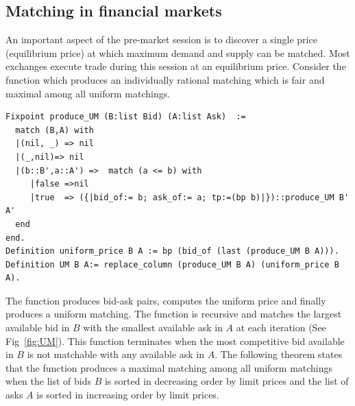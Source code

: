 \documentclass[a4paper,UKenglish,cleveref, autoref]{lipics-v2019}
\begin{document}
\begin{theorem}
\end{theorem}


\subsection{Matching in financial markets}\label{sec:matchingInMarkets} 

An important aspect of the pre-market session is to discover a single price (equilibrium price) at which maximum demand and supply can be matched. Most exchanges execute trade during this session at an equilibrium price.  Consider the function   which produces an individually rational matching which is fair and maximal among all uniform matchings.

\begin{verbatim}
Fixpoint produce_UM (B:list Bid) (A:list Ask)  :=
  match (B,A) with
  |(nil, _) => nil
  |(_,nil)=> nil
  |(b::B',a::A') =>  match (a <= b) with
     |false =>nil
     |true  => ({|bid_of:= b; ask_of:= a; tp:=(bp b)|})::produce_UM B' A'
  end
end.
Definition uniform_price B A := bp (bid_of (last (produce_UM B A))).
Definition UM B A:= replace_column (produce_UM B A) (uniform_price B A).
\end{verbatim}


The function  produces bid-ask pairs,  computes the uniform price and finally  produces a uniform matching. The function  is recursive and  matches the largest available bid in $B$ with the smallest available ask in $A$ at each iteration (See Fig~\ref{fig:UM}). This function terminates when the most competitive bid available in $B$ is not matchable with any available ask in $A$. The following theorem states that the function  produces a maximal matching among all uniform matchings when the list of bids $B$ is sorted in decreasing order by limit prices and the list of asks $A$ is sorted in increasing order by limit prices.

\begin{theorem}
\end{theorem}
\end{document}
